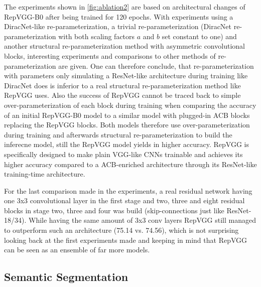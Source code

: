 The experiments shown in \autoref{fig:ablation2} are based on architectural changes of RepVGG-B0 after being trained for 120 epochs. With experiments using a DiracNet-like re-parameterization, a trivial re-parameterization (DiracNet re-parameterization with both scaling factors $a$ and $b$ set constant to one) and another structural re-parameterization method with asymmetric convolutional blocks, interesting experiments and comparisons to other methods of re-parameterization are given. One can therefore conclude, that re-parameterization with parameters only simulating a ResNet-like architecture during training like DiracNet does is inferior to a real structural re-parameterization method like RepVGG uses. Also the success of RepVGG cannot be traced back to simple over-parameterization of each block during training when comparing the accuracy of an initial RepVGG-B0 model to a similar model with plugged-in ACB blocks replacing the RepVGG blocks. Both models therefore use over-parameterization during training and afterwards structural re-parameterization to build the inferecne model, still the RepVGG model yields in higher accuracy. RepVGG is specifically designed to make plain VGG-like CNNs trainable and achieves its higher accuracy compared to a ACB-enriched architecture through its ResNet-like training-time architecture. 

For the last comparison made in the experiments, a real residual network having one 3x3 convolutional layer in the first stage and two, three and eight residual blocks in stage two, three and four was build (skip-connections just like ResNet-18/34). While having the same amount of 3x3 conv layers RepVGG still managed to outperform such an architecture (75.14 vs. 74.56), which is not surprising looking back at the first experiments made and keeping in mind that RepVGG can be seen as an ensemble of far more models. 

\subsection{Semantic Segmentation}
